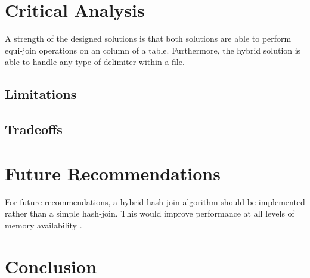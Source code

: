 \documentclass[10pt,twocolumn]{witseiepaper}
\begin{document}
\section{Critical Analysis}
A strength of the designed solutions is that both solutions are able to perform equi-join operations on an column of a table. Furthermore, the hybrid solution is able to handle any type of delimiter within a file.

\subsection{Limitations}

\subsection{Tradeoffs}

\section{Future Recommendations}
For future recommendations, a hybrid hash-join algorithm should be implemented rather than a simple hash-join. This would improve performance at all levels of memory availability \cite{evaluating4JoinAlgorithms}.

\section{Conclusion}



\end{document}
